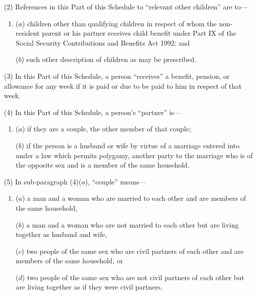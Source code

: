 \documentclass[12pt,a4paper]{article}
\begin{document}
(2) References in this Part of this Schedule to “relevant other children” are to—
\begin{enumerate}\item[]
($a$) children other than qualifying children in respect of whom the non-resident parent or his partner receives child benefit under Part IX of the Social Security Contributions and Benefits Act 1992; and

($b$) such other description of children as may be prescribed.
\end{enumerate}

(3) In this Part of this Schedule, a person “receives” a benefit, pension, or allowance for any week if it is paid or due to be paid to him in respect of that week.

(4) In this Part of this Schedule, a person’s “partner” is—
\begin{enumerate}\item[]
($a$) if they are a couple, the other member of that couple;

($b$) if the person is a husband or wife by virtue of a marriage entered into under a law which permits polygamy, another party to the marriage who is of the opposite sex and is a member of the same household.
\end{enumerate}

%

(5) In sub-paragraph (4)($a$), “couple” means—
\begin{enumerate}\item[]
($a$) a man and a woman who are married to each other and are members of the same household,

($b$) a man and a woman who are not married to each other but are living together as husband and wife,

($c$) two people of the same sex who are civil partners of each other and are members of the same household, or

($d$) two people of the same sex who are not civil partners of each other but are living together as if they were civil partners.
\end{enumerate}
\end{document}
